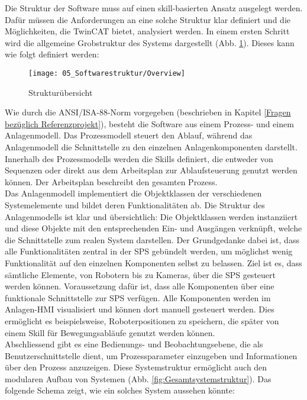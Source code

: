 Die Struktur der Software muss auf einen skill-basierten Ansatz ausgelegt werden. Dafür müssen die Anforderungen an eine solche Struktur klar definiert und die Möglichkeiten, die TwinCAT bietet, analysiert werden. In einem ersten Schritt wird die allgemeine Grobstruktur des Systems dargestellt (Abb. \ref{fig:Strukturübersicht}). Dieses kann wie folgt definiert werden: 

\begin{figure}[h!]
	\centering
	\texttt{[image: 05\_Softwarestruktur/Overview]}
	\captionsetup{justification=centering}
	\caption{Strukturübersicht}
	\label{fig:Strukturübersicht}
\end{figure}

Wie durch die ANSI/ISA-88-Norm vorgegeben (beschrieben in Kapitel \ref{Fragen bezüglich Referenzprojekt}), besteht die Software aus einem Prozess- und einem Anlagenmodell. Das Prozessmodell steuert den Ablauf, während das Anlagenmodell die Schnittstelle zu den einzelnen Anlagenkomponenten darstellt. Innerhalb des Prozessmodells werden die Skills definiert, die entweder von Sequenzen oder direkt aus dem Arbeitsplan zur Ablaufsteuerung genutzt werden können. Der Arbeitsplan beschreibt den gesamten Prozess.
\\
Das Anlagenmodell implementiert die Objektklassen der verschiedenen Systemelemente und bildet deren Funktionalitäten ab. Die Struktur des Anlagenmodells ist klar und übersichtlich: Die Objektklassen werden instanziiert und diese Objekte mit den entsprechenden Ein- und Ausgängen verknüpft, welche die Schnittstelle zum realen System darstellen. Der Grundgedanke dabei ist, dass alle Funktionalitäten zentral in der \Gls{SPS} gebündelt werden, um möglichst wenig Funktionalität auf den einzelnen Komponenten selbst zu belassen. Ziel ist es, dass sämtliche Elemente, von Robotern bis zu Kameras, über die \Gls{SPS} gesteuert werden können. Voraussetzung dafür ist, dass alle Komponenten über eine funktionale Schnittstelle zur \Gls{SPS} verfügen. Alle Komponenten werden im Anlagen-HMI visualisiert und können dort manuell gesteuert werden. Dies ermöglicht es beispielsweise, Roboterpositionen zu speichern, die später von einem Skill für Bewegungsabläufe genutzt werden können. 
\\
Abschliessend gibt es eine Bedienungs- und Beobachtungsebene, die als Benutzerschnittstelle dient, um Prozessparameter einzugeben und Informationen über den Prozess anzuzeigen. Diese Systemstruktur ermöglicht auch den modularen Aufbau von Systemen (Abb. \ref{fig:Gesamtsystemstruktur}). Das folgende Schema zeigt, wie ein solches System aussehen könnte:

